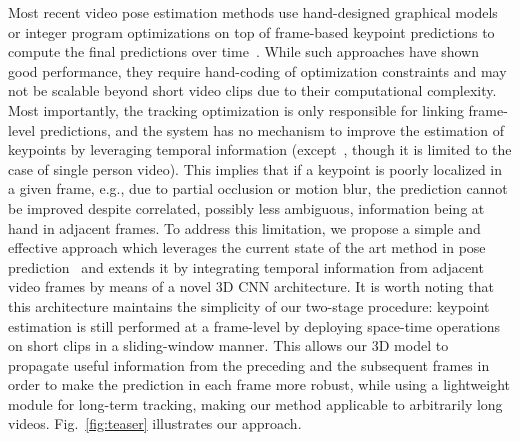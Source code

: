 \documentclass[10pt,twocolumn,letterpaper]{article}
\begin{document}
Most recent video pose estimation methods use hand-designed graphical models or integer program optimizations on top of frame-based keypoint predictions to compute the final predictions over time~\cite{insafutdinov2016articulated,iqbal2016pose,song2017thin}. While such approaches have shown good performance, they require hand-coding of optimization constraints and may not be scalable beyond short video clips due to their computational complexity. Most importantly, the tracking optimization is only responsible for linking frame-level predictions, and the system has no mechanism to improve the estimation of keypoints by leveraging temporal information (except~\cite{song2017thin}, though it is limited to the case of single person video). This implies that if a keypoint is poorly localized in a given frame, e.g., due to partial occlusion or motion blur, the prediction cannot be improved despite correlated, possibly less ambiguous, information being at hand in adjacent frames. To address this limitation, we propose a simple and effective approach which leverages the current state of the art method in pose prediction~\cite{he2017mask} and extends it by integrating temporal information from adjacent video frames by means of a novel 3D CNN architecture. It is worth noting that this architecture maintains the simplicity of our two-stage procedure: keypoint estimation is still performed at a frame-level by deploying space-time operations on short clips in a sliding-window manner. This allows our 3D model to propagate useful information from the preceding and the subsequent frames in order to make the prediction in each frame more robust, while using a lightweight module for long-term tracking, making our method applicable to arbitrarily long videos. Fig.~\ref{fig:teaser} illustrates our approach.
\end{document}
